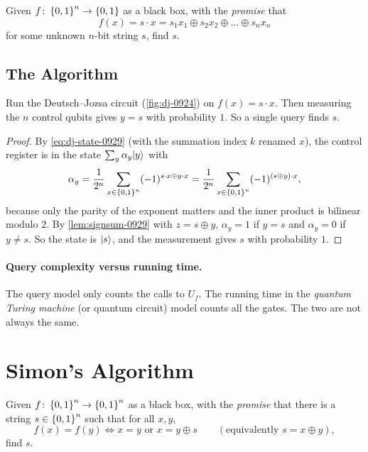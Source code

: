 \begin{problem}
    Given $f \colon \left\lbrace0,1\right\rbrace^n \to \left\lbrace0,1\right\rbrace$ as a black box, with the \emph{promise} that
    \[f(x) = s \cdot x = s_1 x_1 \oplus s_2 x_2 \oplus \dots \oplus s_n x_n\]
    for some unknown $n$-bit string $s$, find $s$.
\end{problem}

\subsection{The Algorithm}

\begin{theorem}\label{thm:bv-0929}
    Run the Deutsch--Jozsa circuit (\cref{fig:dj-0924}) on $f(x) = s \cdot x$. Then measuring the $n$
    control qubits gives $y = s$ with probability $1$. So a single query finds $s$.
\end{theorem}

\begin{proof}
    By \cref{eq:dj-state-0929} (with the summation index $k$ renamed $x$), the control register is in
    the state $\sum_{y} \alpha_y \lvert y \rangle$ with
    \[\alpha_y = \frac{1}{2^n} \sum_{x \in \left\lbrace0,1\right\rbrace^n} (-1)^{s \cdot x \oplus y \cdot x}
        = \frac{1}{2^n} \sum_{x \in \left\lbrace0,1\right\rbrace^n} (-1)^{(s \oplus y) \cdot x},\]
    because only the parity of the exponent matters and the inner product is bilinear modulo $2$. By
    \cref{lem:signsum-0929} with $z = s \oplus y$, $\alpha_y = 1$ if $y = s$ and $\alpha_y = 0$ if
    $y \neq s$. So the state is $\lvert s \rangle$, and the measurement gives $s$ with probability $1$.
\end{proof}

\paragraph{Query complexity versus running time.} The query model only counts the calls to $U_f$. The
running time in the \emph{quantum Turing machine} (or quantum circuit) model counts all the gates.
The two are not always the same.

\section{Simon's Algorithm}

\begin{problem}
    Given $f \colon \left\lbrace0,1\right\rbrace^n \to \left\lbrace0,1\right\rbrace^n$ as a black box, with the \emph{promise} that there is a
    string $s \in \left\lbrace0,1\right\rbrace^n$ such that for all $x, y$,
    \[f(x) = f(y) \iff x = y \text{ or } x = y \oplus s
        \qquad (\text{equivalently } s = x \oplus y),\]
    find $s$.
\end{problem}

